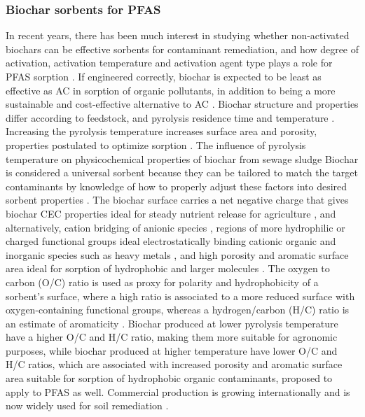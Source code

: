 \subsubsection{Biochar sorbents for PFAS}
In recent years, there has been much interest in studying whether non-activated biochars can be effective sorbents for contaminant remediation, and how degree of activation, activation temperature and activation agent type plays a role for PFAS sorption \citep{Sormo2021}. If engineered correctly, biochar is expected to be least as effective as AC in sorption of organic pollutants, in addition to being a more sustainable and cost-effective alternative to AC \citep{Alhashimi2017, Sormo2021}. Biochar structure and properties differ according to feedstock, and pyrolysis residence time and temperature \citep{Ahmad2014}. Increasing the pyrolysis temperature increases surface area and porosity, properties postulated to optimize sorption \citep{Ahmad2014}. The influence of pyrolysis temperature on physicochemical properties of biochar from sewage sludge \citep{Figueiredo2018}Biochar is considered a universal sorbent because they can be tailored to match the target contaminants by knowledge of how to properly adjust these factors into desired sorbent properties \citep{Ahmad2014}. The biochar surface carries a net negative charge that gives biochar CEC properties ideal for steady nutrient release for agriculture \citep{das2020application}, and alternatively, cation bridging of anionic species \citep{silvani2019can}, regions of more hydrophilic or charged functional groups ideal electrostatically binding cationic organic and inorganic species such as heavy metals \citep{silvani2019can,zhang2013sorption}, and high porosity and aromatic surface area ideal for sorption of hydrophobic and larger molecules \citep{Cornelissen2005}. The oxygen to carbon (O/C) ratio is used as proxy for polarity and hydrophobicity of a sorbent's surface, where a high ratio is associated to a more reduced surface with oxygen-containing functional groups, whereas a hydrogen/carbon (H/C) ratio is an estimate of aromaticity \citep{Ahmad2014}. Biochar produced at lower pyrolysis temperature have a higher O/C and H/C ratio, making them more suitable for agronomic purposes, while biochar produced at higher temperature have lower O/C and H/C ratios, which are associated with increased porosity and aromatic surface area suitable for sorption of hydrophobic organic contaminants, proposed to apply to PFAS as well. Commercial production is growing internationally and is now widely used for soil remediation \citep{Ahmad2014}.

